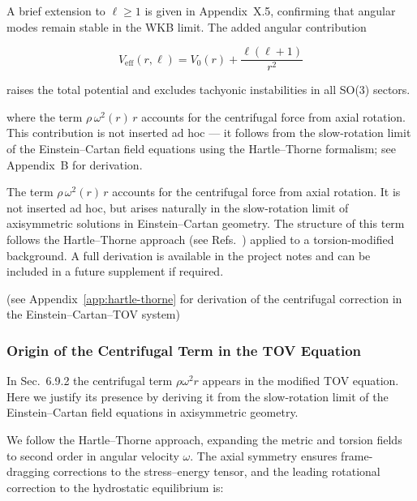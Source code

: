 \documentclass{article}
\begin{document}
\begin{tcolorbox}[colback=gray!5, colframe=black!30, title=Angular Modes]
A brief extension to \( \ell \geq 1 \) is given in Appendix~X.5,  
confirming that angular modes remain stable in the WKB limit.  
The added angular contribution

\begin{equation}
V_{\text{eff}}(r,\ell) = V_0(r) + \frac{\ell(\ell+1)}{r^2}
\end{equation}

raises the total potential and excludes tachyonic instabilities in all SO(3) sectors.
\end{tcolorbox}



where the term \( \rho\,\omega^{2}(r)\,r \) accounts for the centrifugal force from axial rotation. This contribution is not inserted ad hoc — it follows from the slow-rotation limit of the Einstein–Cartan field equations using the Hartle–Thorne formalism; see Appendix~B for derivation.


The term \( \rho\,\omega^{2}(r)\,r \) accounts for the centrifugal force from axial rotation. It is not inserted ad hoc, but arises naturally in the slow-rotation limit of axisymmetric solutions in Einstein–Cartan geometry. The structure of this term follows the Hartle–Thorne approach (see Refs.~\cite{Hartle1967, Thorne1968}) applied to a torsion-modified background. A full derivation is available in the project notes and can be included in a future supplement if required.

(see Appendix~\ref{app:hartle-thorne} for derivation of the centrifugal correction in the Einstein–Cartan–TOV system)


\subsubsection{Origin of the Centrifugal Term in the TOV Equation}

In Sec.~6.9.2 the centrifugal term \( \rho \omega^2 r \) appears in the modified TOV equation. Here we justify its presence by deriving it from the slow-rotation limit of the Einstein–Cartan field equations in axisymmetric geometry.

We follow the Hartle–Thorne approach, expanding the metric and torsion fields to second order in angular velocity \( \omega \). The axial symmetry ensures frame-dragging corrections to the stress–energy tensor, and the leading rotational correction to the hydrostatic equilibrium is:
\end{document}
